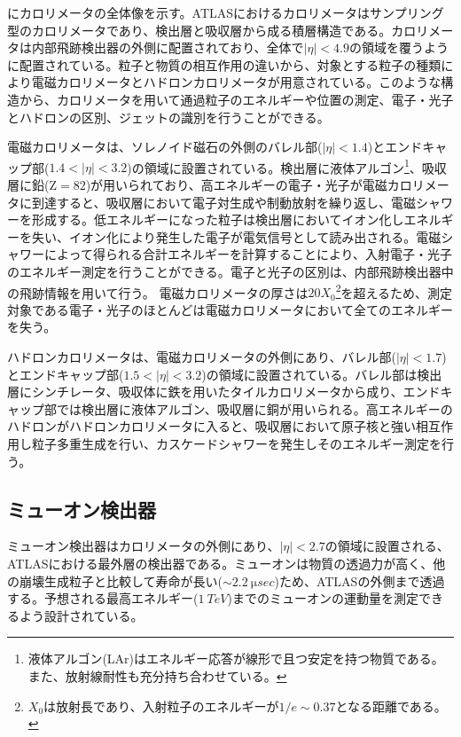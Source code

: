 にカロリメータの全体像を示す。ATLASにおけるカロリメータはサンプリング型のカロリメータであり、検出層と吸収層から成る積層構造である。カロリメータは内部飛跡検出器の外側に配置されており、全体で$|\eta|<4.9$の領域を覆うように配置されている。粒子と物質の相互作用の違いから、対象とする粒子の種類により電磁カロリメータとハドロンカロリメータが用意されている。このような構造から、カロリメータを用いて通過粒子のエネルギーや位置の測定、電子・光子とハドロンの区別、ジェットの識別を行うことができる。

電磁カロリメータは、ソレノイド磁石の外側のバレル部($|\eta|<1.4$)とエンドキャップ部($1.4<|\eta|<3.2$)の領域に設置されている。検出層に液体アルゴン\footnote{液体アルゴン(LAr)はエネルギー応答が線形で且つ安定を持つ物質である。また、放射線耐性も充分持ち合わせている。}、吸収層に鉛($\mathrm{Z}=82$)が用いられており、高エネルギーの電子・光子が電磁カロリメータに到達すると、吸収層において電子対生成や制動放射を繰り返し、電磁シャワーを形成する。低エネルギーになった粒子は検出層においてイオン化しエネルギーを失い、イオン化により発生した電子が電気信号として読み出される。電磁シャワーによって得られる合計エネルギーを計算することにより、入射電子・光子のエネルギー測定を行うことができる。電子と光子の区別は、内部飛跡検出器中の飛跡情報を用いて行う。
電磁カロリメータの厚さは$20X_0$\footnote{$X_0$は放射長であり、入射粒子のエネルギーが$1/e\sim0.37$となる距離である。}を超えるため、測定対象である電子・光子のほとんどは電磁カロリメータにおいて全てのエネルギーを失う。

ハドロンカロリメータは、電磁カロリメータの外側にあり、バレル部($|\eta|<1.7$)とエンドキャップ部($1.5<|\eta|<3.2$)の領域に設置されている。バレル部は検出層にシンチレータ、吸収体に鉄を用いたタイルカロリメータから成り、エンドキャップ部では検出層に液体アルゴン、吸収層に銅が用いられる。高エネルギーのハドロンがハドロンカロリメータに入ると、吸収層において原子核と強い相互作用し粒子多重生成を行い、カスケードシャワーを発生しそのエネルギー測定を行う。



\subsection{ミューオン検出器}
\label{sec:mumu}
ミューオン検出器はカロリメータの外側にあり、$|\eta|<2.7$の領域に設置される、ATLASにおける最外層の検出器である。ミューオンは物質の透過力が高く、他の崩壊生成粒子と比較して寿命が長い($\sim 2.2\ \si{\micro sec}$)ため、ATLASの外側まで透過する。予想される最高エネルギー($1\ \si{TeV}$)までのミューオンの運動量を測定できるよう設計されている。

